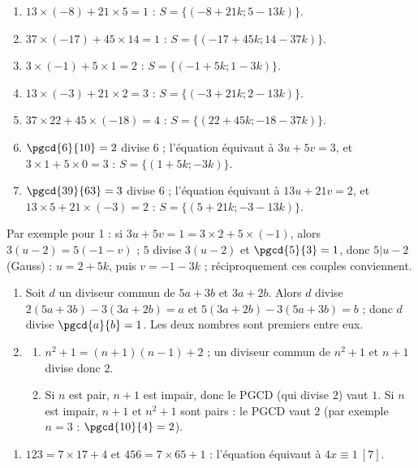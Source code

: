 \begin{corrige}
\begin{sol}
\begin{enumerate}
\item $13 \times (-8) + 21 \times 5 = 1$ : $S = \{ (-8 + 21k ; 5 - 13k) \}$.
\item $37 \times (-17) + 45 \times 14 = 1$ : $S = \{ (-17 + 45k ; 14 - 37k) \}$.
\item $3 \times (-1) + 5 \times 1 = 2$ : $S = \{ (-1 + 5k ; 1 - 3k) \}$.
\item $13 \times (-3) + 21 \times 2 = 3$ : $S = \{ (-3 + 21k ; 2 - 13k) \}$.
\item $37 \times 22 + 45 \times (-18) = 4$ : $S = \{ (22 + 45k ; -18 - 37k) \}$.
\item $\pgcd{6}{10} = 2$ divise $6$ ; l'\'equation \'equivaut \`a $3u + 5v = 3$, et $3 \times 1 + 5 \times 0 = 3$ : $S = \{ (1 + 5k ; -3k) \}$.
\item $\pgcd{39}{63} = 3$ divise $6$ ; l'\'equation \'equivaut \`a $13u + 21v = 2$, et $13 \times 5 + 21 \times (-3) = 2$ :
      $S = \{ (5 + 21k ; -3 - 13k) \}$.
\end{enumerate}
Par exemple pour 1 : si $3u + 5v = 1 = 3 \times 2 + 5 \times (-1)$, alors $3(u - 2) = 5(-1 - v)$ ; $5$ divise $3(u-2)$ et
$\pgcd{5}{3} = 1$, donc $5 | u - 2$ (Gauss) : $u = 2 + 5k$, puis $v = -1 - 3k$ ; r\'eciproquement ces couples conviennent.
\end{sol}
%
\begin{sol}
\begin{enumerate}
\item Soit $d$ un diviseur commun de $5a + 3b$ et $3a + 2b$. Alors $d$ divise $2(5a+3b) - 3(3a+2b) = a$
      et $5(3a+2b) - 3(5a+3b) = b$ ; donc $d$ divise $\pgcd{a}{b} = 1$. Les deux nombres sont premiers entre eux.
\item \begin{enumerate}
      \item $n^2 + 1 = (n+1)(n-1) + 2$ ; un diviseur commun de $n^2+1$ et $n+1$ divise donc $2$.
      \item Si $n$ est pair, $n+1$ est impair, donc le PGCD (qui divise $2$) vaut $1$.
            Si $n$ est impair, $n + 1$ et $n^2 + 1$ sont pairs : le PGCD vaut $2$ (par exemple $n = 3$ : $\pgcd{10}{4} = 2$).
      \end{enumerate}
\end{enumerate}
\end{sol}
%
\begin{sol}
\begin{enumerate}
\item $123 = 7 \times 17 + 4$ et $456 = 7 \times 65 + 1$ : l'\'equation \'equivaut \`a $4x \equiv 1 \ [7]$.

\end{enumerate}
\end{sol}
\end{corrige}
